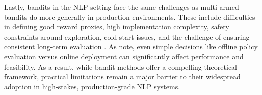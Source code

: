 \documentclass[11pt]{article}
\begin{document}
Lastly, bandits in the NLP setting face the same challenges as multi-armed bandits do more generally in production environments. These include difficulties in defining good reward proxies, high implementation complexity, safety constraints around exploration, cold-start issues, and the challenge of ensuring consistent long-term evaluation \citep{abensur2019productizationchallengescontextualmultiarmed, akker2023practicalbanditsindustryperspective}. As \citet{akker2023practicalbanditsindustryperspective} note, even simple decisions like offline policy evaluation versus online deployment can significantly affect performance and feasibility. As a result, while bandit methods offer a compelling theoretical framework, practical limitations remain a major barrier to their widespread adoption in high-stakes, production-grade NLP systems.






\end{document}
